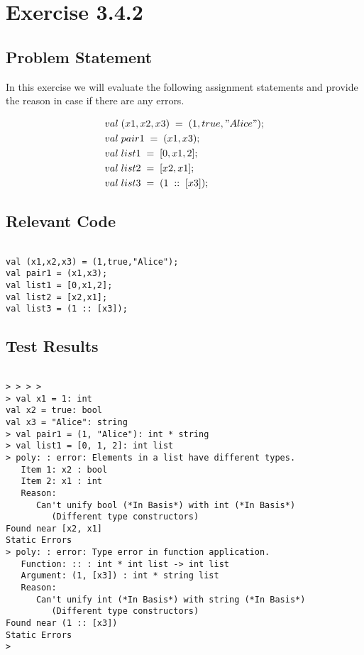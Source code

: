 \documentclass{report}
\begin{document}
\chapter{Exercise 3.4.2}
\label{cha:exercise-3.4.2}

\section{Problem Statement}
\label{sec:problem-statement-2}
In this exercise we will evaluate the following assignment statements and provide the reason in case if there are any errors.


\begin{align*} 
&val\; (x1,x2,x3)\; =\; (1,true,"Alice");\\
&val\; pair1\; =\; (x1,x3);\\
&val\; list1\; =\; [0,x1,2];\\
&val\; list2\; =\; [x2,x1];\\
&val\; list3\; =\; (1\; ::\; [x3]);\\ 
\end{align*}

\section{Relevant Code}
\label{sec:relevant-code-2}

\lstset{frameround=tttt}
\begin{lstlisting}[frame=tRBL]

val (x1,x2,x3) = (1,true,"Alice");
val pair1 = (x1,x3);
val list1 = [0,x1,2];
val list2 = [x2,x1];
val list3 = (1 :: [x3]);

\end{lstlisting}

\section{Test Results}
\label{sec:test-results-2}

\setcounter{sessioncount}{0}
\begin{session}
  \begin{scriptsize}
\begin{verbatim}

> > > > 
> val x1 = 1: int
val x2 = true: bool
val x3 = "Alice": string
> val pair1 = (1, "Alice"): int * string
> val list1 = [0, 1, 2]: int list
> poly: : error: Elements in a list have different types.
   Item 1: x2 : bool
   Item 2: x1 : int
   Reason:
      Can't unify bool (*In Basis*) with int (*In Basis*)
         (Different type constructors)
Found near [x2, x1]
Static Errors
> poly: : error: Type error in function application.
   Function: :: : int * int list -> int list
   Argument: (1, [x3]) : int * string list
   Reason:
      Can't unify int (*In Basis*) with string (*In Basis*)
         (Different type constructors)
Found near (1 :: [x3])
Static Errors
> 
 
\end{verbatim}
  \end{scriptsize}
\end{session}
\end{document}
